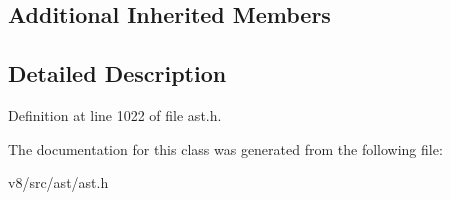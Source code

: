 \subsection*{Additional Inherited Members}


\subsection{Detailed Description}


Definition at line 1022 of file ast.\+h.



The documentation for this class was generated from the following file\+:\begin{DoxyCompactItemize}
\item 
v8/src/ast/ast.\+h\end{DoxyCompactItemize}
